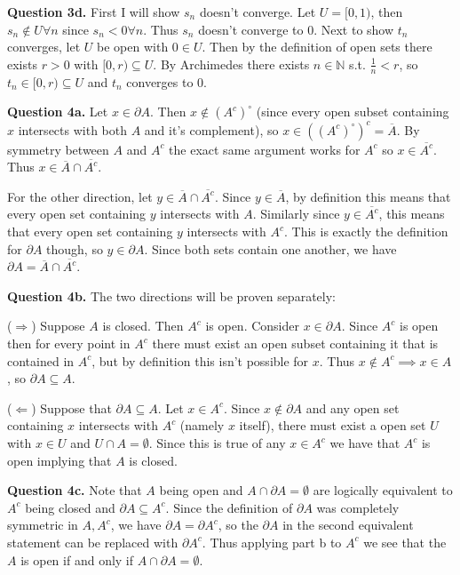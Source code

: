 \documentclass[letterpaper, reqno,11pt]{article}
\begin{document}
{\medskip\noindent\bf Question 3d.} First I will show $s_n$ doesn't converge. Let $U=[0,1)$, then $s_n\notin U\forall n$ since $s_n<0\forall n$. Thus $s_n$ doesn't converge to 0. Next to show $t_n$ converges, let $U$ be open with $0\in U$. Then by the definition of open sets there exists $r>0$ with $[0,r)\subseteq U$. By Archimedes there exists $n\in \mathbb{N}$ s.t. $\frac{1}{n}<r$, so $t_n\in [0,r)\subseteq U$ and $t_n$ converges to 0.

\newpage\phantom{blabla}
\newpage

{\medskip\noindent\bf Question 4a.} Let $x\in \partial A$. Then $x\notin (A^{c})^{\circ}$ (since every open subset containing $x$ intersects with both $A$ and it's complement), so $x\in ((A^{c})^{\circ})^{c}=\overline{A}$. By symmetry between $A$ and $A^{c}$ the exact same argument works for $A^{c}$ so $x\in \overline{A^{c}}$. Thus $x\in \overline{A}\cap \overline{A^{c}}$.

For the other direction, let $y\in \overline{A}\cap \overline{A^{c}}$. Since $y\in \overline{A}$, by definition this means that every open set containing $y$ intersects with $A$. Similarly since $y\in \overline{A^{c}}$, this means that every open set containing $y$ intersects with $A^{c}$. This is exactly the definition for $\partial A$ though, so $y\in \partial A$. Since both sets contain one another, we have $\partial A=\overline{A}\cap \overline{A^{c}}$.

{\medskip\noindent\bf Question 4b.} The two directions will be proven separately:

($\Longrightarrow$) Suppose $A$ is closed. Then $A^{c}$ is open. Consider $x\in \partial A$. Since $A^{c}$ is open then for every point in $A^{c}$ there must exist an open subset containing it that is contained in $A^{c}$, but by definition this isn't possible for $x$. Thus $x\notin A^{c}\implies x\in A$, so $\partial A\subseteq A$.

($\Longleftarrow$) Suppose that $\partial A\subseteq A$. Let $x\in A^{c}$. Since $x\notin \partial A$ and any open set containing $x$ intersects with $A^{c}$ (namely $x$ itself), there must exist a open set $U$ with $x\in U$ and $U\cap A=\emptyset$. Since this is true of any $x\in A^{c}$ we have that $A^{c}$ is open implying that $A$ is closed.

{\medskip\noindent\bf Question 4c.} Note that $A$ being open and $A\cap \partial A=\emptyset$ are logically equivalent to $A^{c}$ being closed and $\partial A\subseteq A^{c}$. Since the definition of $\partial A$ was completely symmetric in $A,A^{c}$, we have $\partial A=\partial A^{c}$, so the $\partial A$ in the second equivalent statement can be replaced with $\partial A^{c}$. Thus applying part b to $A^{c}$ we see that the $A$ is open if and only if $A\cap\partial A=\emptyset$.
\end{document}
